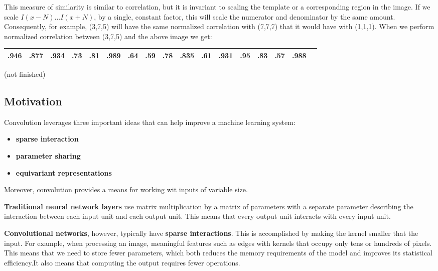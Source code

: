 \documentclass{report}
\begin{document}
This measure of similarity is similar to correlation, but it is invariant to scaling the template or a corresponding region in the image. If we scale $I(x-N)...I(x+N)$, by a single, constant factor, this will scale the numerator and denominator by the same amount. Consequently, for example, (3,7,5) will have the same normalized correlation with (7,7,7) that it would have with (1,1,1). When we perform normalized correlation between (3,7,5) and the above image we get:

\begin{table}[h]
\centering
\label{my-label-9}
\begin{tabular}{|l|l|l|l|l|l|l|l|l|l|l|l|l|l|l|l|l|}
\hline
.946 & .877 & .934 & .73 & .81 & .989 & .64 & .59 & .78 & .835 & .61 & .931 & .95 & .83 & .57 & .988 \\ \hline
\end{tabular}
\end{table}

(not finished)

\subsection{Motivation}
Convolution leverages three important ideas that can help improve a machine learning system:
\begin{itemize}
	\item \textbf{sparse interaction}
    \item \textbf{parameter sharing}
    \item \textbf{equivariant representations}
\end{itemize}
Moreover, convolution provides a means for working wit inputs of variable size.\newline\newline

\noindent \textbf{Traditional neural network layers} use matrix multiplication by a matrix of parameters with a separate parameter describing the interaction between each input unit and each output unit. This means that every output unit interacts with every input unit.\newline

\noindent \textbf{Convolutional networks}, however, typically have \textbf{sparse interactions}. This is accomplished by making the kernel smaller that the input. For example, when processing an image, meaningful features such as edges with kernels that occupy only tens or hundreds of pixels. This means that we need to store fewer parameters, which both reduces the memory requirements of the model and improves its statistical efficiency.It also means that computing the output requires fewer operations.\newline
\end{document}
